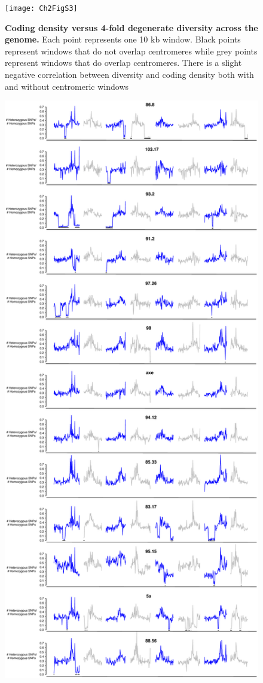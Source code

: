 \begin{figure}[ht!]
      \centering
       \texttt{[image: Ch2FigS3]}
    \caption{\textbf{Coding density versus 4-fold degenerate diversity across the genome.} Each point represents one 10 kb window. Black points represent windows that do not overlap centromeres while grey points represent windows that do overlap centromeres. There is a slight negative correlation between diversity and coding density both with and without centromeric windows}
    \label{fig:figS3}
\end{figure}

\begin{figure}[ht!]
      \centering
       \includegraphics[scale=0.1]{Ch2FigS4}

\end{figure}
